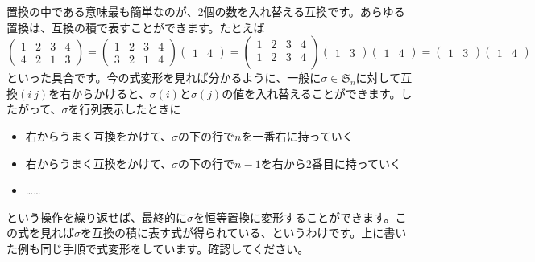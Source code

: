 置換の中である意味最も簡単なのが、$2$個の数を入れ替える互換です。あらゆる置換は、互換の積で表すことができます。たとえば
\[
\begin{pmatrix}
1 & 2 & 3 & 4 \\
4 & 2 & 1 & 3
\end{pmatrix}
= 
\begin{pmatrix}
1 & 2 & 3 & 4 \\
3 & 2 & 1 & 4
\end{pmatrix}
\begin{pmatrix}
1 & 4
\end{pmatrix}
=
\begin{pmatrix}
1 & 2 & 3 & 4 \\
1 & 2 & 3 & 4 \\
\end{pmatrix}
\begin{pmatrix}
1 & 3
\end{pmatrix}
\begin{pmatrix}
1 & 4
\end{pmatrix}
=
\begin{pmatrix}
1 & 3
\end{pmatrix}
\begin{pmatrix}
1 & 4
\end{pmatrix}
\]
といった具合です。今の式変形を見れば分かるように、一般に$\sigma \in \mathfrak{S}_n$に対して互換$(i\ j)$を右からかけると、$\sigma(i)$と$\sigma(j)$の値を入れ替えることができます。したがって、$\sigma$を行列表示したときに
\begin{itemize}
\item 右からうまく互換をかけて、$\sigma$の下の行で$n$を一番右に持っていく
\item 右からうまく互換をかけて、$\sigma$の下の行で$n - 1$を右から$2$番目に持っていく
\item ……
\end{itemize}
という操作を繰り返せば、最終的に$\sigma$を恒等置換に変形することができます。この式を見れば$\sigma$を互換の積に表す式が得られている、というわけです。上に書いた例も同じ手順で式変形をしています。確認してください。

